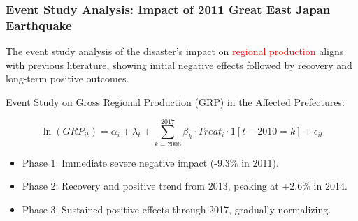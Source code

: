 \documentclass[serif, aspectratio=169]{beamer}
\newcommand{\returnbutton}[2]{%
  \vspace{-1.0cm}  %
  \hfill  %
  \hyperlink{#1}{%
    {\footnotesize\beamerbutton{#2}}%
  }%
  \vspace{0.3cm}  %
}
\begin{document}
\begin{frame}[label=event_study_results]
\frametitle{Event Study Analysis: Impact of 2011 Great East Japan Earthquake}

\vspace{0.20cm}

\returnbutton{conclusion}{Return}

\vspace{-0.20cm}

The event study analysis of the disaster's impact on \textcolor{red}{regional production} aligns with previous literature, showing initial negative effects followed by recovery and long-term positive outcomes.

    \begin{minipage}[c]{0.4\linewidth}
        \small
        \vspace{-1.6cm}
        
Event Study on Gross Regional Production (GRP) in the Affected Prefectures:

\vspace{-0.3cm}

\fontsize{8}{10}\selectfont
\begin{equation}
\ln(GRP_{it}) = \alpha_i + \lambda_t + \sum_{k=2006}^{2017} \beta_k \cdot Treat_i \cdot 1[t-2010=k] + \epsilon_{it}
\end{equation}

\normalsize

\begin{itemize}
    \item Phase 1: Immediate severe negative impact (-9.3\% in 2011).
    \item Phase 2: Recovery and positive trend from 2013, peaking at +2.6\% in 2014.
    \item Phase 3: Sustained positive effects through 2017, gradually normalizing.
\end{itemize}
        
        \vspace{-2.0cm}
        

\end{minipage}
\end{frame}
\end{document}
